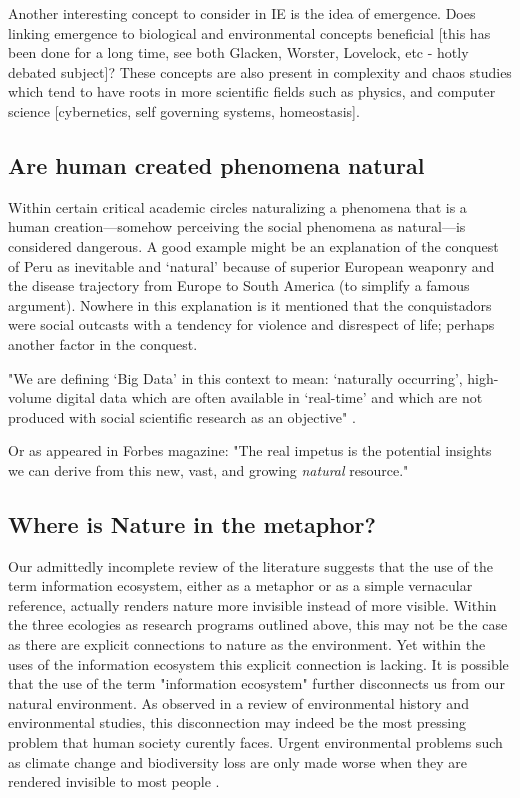 Another interesting concept to consider in IE is the idea of emergence. Does linking emergence to biological and environmental concepts beneficial [this has been done for a long time, see both Glacken, Worster, Lovelock, etc - hotly debated subject]? These concepts are also present in complexity and chaos studies which tend to have roots in more scientific fields such as physics, and computer science [cybernetics, self governing systems, homeostasis].

\subsection{Are human created phenomena natural}

Within certain critical academic circles naturalizing a phenomena that is a human creation—somehow perceiving the social phenomena as natural—is considered dangerous. A good example might be an explanation of the conquest of Peru as inevitable and ‘natural’ because of superior European weaponry and the disease trajectory from Europe to South America (to simplify a famous argument). Nowhere in this explanation is it mentioned that the conquistadors were social outcasts with a tendency for violence and disrespect of life; perhaps another factor in the conquest. 

"We are defining ‘Big Data’ in this context to mean: ‘naturally occurring’, high-volume digital data which are often available in ‘real-time’ and which are not produced with social scientific research as an objective" \citep{ncrm_2015}.

Or as appeared in Forbes magazine: "The real impetus is the potential insights we can derive from this new, vast, and growing \textit{natural} resource." \citep[][emphasis ours]{rotella_2012}

\subsection{Where is Nature in the metaphor?}

Our admittedly incomplete review of the literature suggests that the use of the term information ecosystem, either as a metaphor or as a simple vernacular reference, actually renders nature more invisible instead of more visible. Within the three ecologies as research programs outlined above, this may not be the case as there are explicit connections to nature as the environment. Yet within the uses of the information ecosystem this explicit connection is lacking. It is possible that the use of the term "information ecosystem" further disconnects us from our natural environment. As observed in a review of environmental history and environmental studies, this disconnection may indeed be the most pressing problem that human society curently faces. Urgent environmental problems such as climate change and biodiversity loss are only made worse when they are rendered invisible to most people \citep{worthy_2013}.

